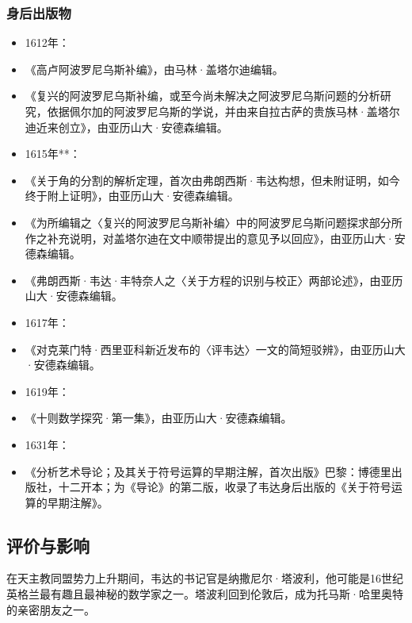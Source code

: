 \subsubsection{身后出版物}
\begin{itemize}
\item 1612年：
\item 《高卢阿波罗尼乌斯补编》，由马林·盖塔尔迪编辑。
\item 《复兴的阿波罗尼乌斯补编，或至今尚未解决之阿波罗尼乌斯问题的分析研究，依据佩尔加的阿波罗尼乌斯的学说，并由来自拉古萨的贵族马林·盖塔尔迪近来创立》，由亚历山大·安德森编辑。
\item 1615年**：
\item 《关于角的分割的解析定理，首次由弗朗西斯·韦达构想，但未附证明，如今终于附上证明》，由亚历山大·安德森编辑。
\item 《为所编辑之〈复兴的阿波罗尼乌斯补编〉中的阿波罗尼乌斯问题探求部分所作之补充说明，对盖塔尔迪在文中顺带提出的意见予以回应》，由亚历山大·安德森编辑。
\item 《弗朗西斯·韦达·丰特奈人之〈关于方程的识别与校正〉两部论述》，由亚历山大·安德森编辑。
\item 1617年：
\item 《对克莱门特·西里亚科新近发布的〈评韦达〉一文的简短驳辨》，由亚历山大·安德森编辑。
\item 1619年：
\item 《十则数学探究·第一集》，由亚历山大·安德森编辑。
\item 1631年：
\item 《分析艺术导论；及其关于符号运算的早期注解，首次出版》巴黎：博德里出版社，十二开本；为《导论》的第二版，收录了韦达身后出版的《关于符号运算的早期注解》。
\end{itemize}
\subsection{评价与影响}
在天主教同盟势力上升期间，韦达的书记官是纳撒尼尔·塔波利，他可能是16世纪英格兰最有趣且最神秘的数学家之一。塔波利回到伦敦后，成为托马斯·哈里奥特的亲密朋友之一。

